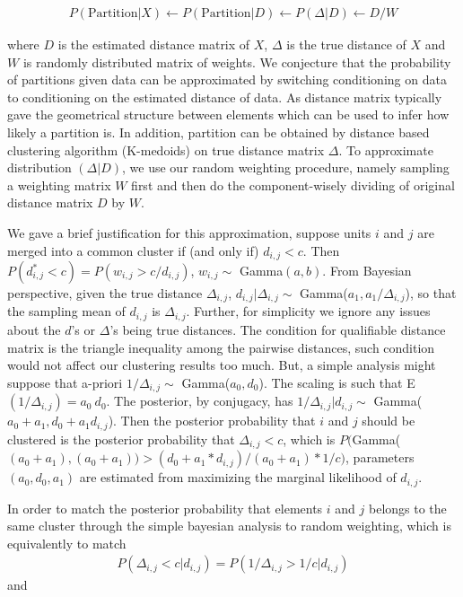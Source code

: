 \documentclass[aoas,preprint]{imsart}
\begin{document}
\begin{eqnarray*}
P(\text{Partition} | X) \leftarrow P(\text{Partition} | D) \leftarrow P(\Delta | D) \leftarrow D / W
\end{eqnarray*} 

where $D$ is the estimated distance matrix of $X$, $\Delta$ is the true distance of $X$ and $W$ is randomly distributed matrix of weights. We conjecture that the probability of partitions given data can be approximated by switching conditioning on data to conditioning on the estimated distance of data. As distance matrix typically gave the geometrical structure between elements which can be used to infer how likely a partition is.  In addition, partition can be obtained by  distance based clustering algorithm (K-medoids) on true distance matrix $\Delta$.  To approximate distribution $(\Delta | D)$, we use our random weighting procedure, namely sampling a weighting matrix $W$ first and then do the component-wisely dividing of original distance matrix $D$ by $W$.

We gave a brief justification for this approximation, suppose units $i$ and $j$ are merged into a common cluster if (and only if) $d_{i,j} < c$. Then $P(d^*_{i,j} < c) = P(w_{i,j} > c / d_{i,j})$, $w_{i,j} \sim$ Gamma$(a, b)$. From Bayesian perspective, given the true distance $\Delta_{i,j}$, $d_{i,j} | \Delta_{i,j} \sim$ Gamma($a_1, a_1 / \Delta_{i,j}$), so that the sampling mean of $d_{i,j}$ is $\Delta_{i,j}$.  Further, for simplicity we ignore any issues about the $d$'s or $\Delta$'s being true distances. The condition for qualifiable distance matrix is the triangle inequality among the pairwise distances, such condition would not affect our clustering results too much. But, a simple analysis might suppose that a-priori $1 / \Delta_{i,j} \sim$ Gamma($a_0, d_0$). The scaling is such that E$(1 / \Delta_{i,j}) = a_0 \ d_0$. The posterior, by conjugacy, has $1 / \Delta_{i,j} | d_{i,j} \sim$ Gamma($a_0 + a_1, d_0 + a_1d_{i,j}$). Then the posterior probability that $i$ and $j$ should be clustered is the posterior probability that $\Delta_{i,j} < c$, which is $P($Gamma($(a_0 + a_1),(a_0 + a_1)) > (d_0 + a_1 * d_{i,j}) / (a_0 + a_1) * 1/c )$, parameters $(a_0, d_0, a_1)$ are estimated from maximizing the marginal likelihood of $d_{i,j}$.

In order to match the posterior probability that elements $i$ and $j$ belongs to the same cluster through the simple bayesian analysis to random weighting, which is equivalently to match 
\begin{eqnarray*} 
P(\Delta_{i,j} < c | d_{i,j}) = P( 1 /  \Delta_{i,j} > 1 / c | d_{i,j})
\end{eqnarray*}
and 
\end{document}
